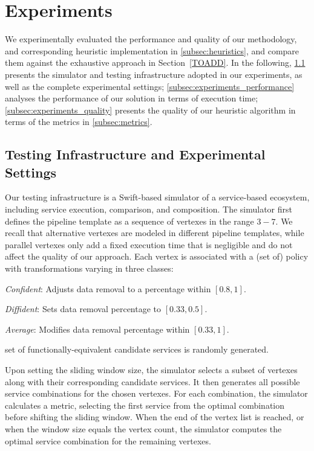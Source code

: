 \section{Experiments}\label{sec:experiment}
We experimentally evaluated the performance and quality of our methodology, and corresponding heuristic implementation in \cref{subsec:heuristics},
and compare them against the exhaustive approach in Section~\cref{TOADD}. In the following,
\cref{subsec:experiments_infrastructure} presents the simulator and testing infrastructure adopted in our experiments, as well as the complete experimental settings; \cref{subsec:experiments_performance} analyses the performance of our solution in terms of execution time; \cref{subsec:experiments_quality} presents the quality of our heuristic algorithm in terms of the metrics in \cref{subsec:metrics}.

\subsection{Testing Infrastructure and Experimental Settings}\label{subsec:experiments_infrastructure}
Our testing infrastructure is a Swift-based simulator of a service-based ecosystem, including service execution, comparison, and composition.
The simulator first defines the pipeline template as a sequence of vertexes in the range $3-7$.
We recall that alternative vertexes are modeled in different pipeline templates,
while parallel vertexes only add a fixed execution time that is negligible and do not affect the quality of our approach.
Each vertex is associated with a (set of) policy with transformations varying in three classes:

\begin{itemize*}[label=roman*]
  \item \textit{Confident}: Adjusts data removal to a percentage within $[0.8,1]$.
  \item \textit{Diffident}: Sets data removal percentage to $[0.33,0.5]$.
  \item \textit{Average}: Modifies data removal percentage within $[0.33,1]$.
\end{itemize*}
set of functionally-equivalent candidate services is randomly generated.

Upon setting the sliding window size, the simulator selects a subset of vertexes along with their corresponding candidate services.
It then generates all possible service combinations for the chosen vertexes.
For each combination, the simulator calculates a metric, selecting the first service from the optimal combination before shifting the sliding window.
When the end of the vertex list is reached, or when the window size equals the vertex count, the simulator computes the optimal service combination for the remaining vertexes.

